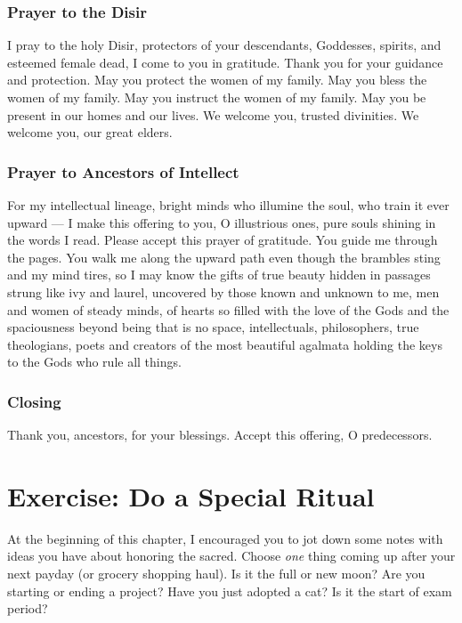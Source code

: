 \documentclass[
]{book}
\begin{document}
\hypertarget{prayer-to-the-disir}{%
\subsubsection{Prayer to the Disir}\label{prayer-to-the-disir}}

I pray to the holy Disir,
protectors of your descendants,
Goddesses, spirits, and esteemed female dead,
I come to you in gratitude.
Thank you for your guidance and protection.
May you protect the women of my family.
May you bless the women of my family.
May you instruct the women of my family.
May you be present in our homes and our lives.
We welcome you, trusted divinities.
We welcome you, our great elders.

\hypertarget{prayer-to-ancestors-of-intellect}{%
\subsubsection{Prayer to Ancestors of Intellect}\label{prayer-to-ancestors-of-intellect}}

For my intellectual lineage,
bright minds who illumine the soul,
who train it ever upward ---
I make this offering to you, O illustrious ones,
pure souls shining in the words I read.
Please accept this prayer of gratitude.
You guide me through the pages.
You walk me along the upward path
even though the brambles sting and my mind tires,
so I may know the gifts of true beauty
hidden in passages strung like ivy and laurel,
uncovered by those known and unknown to me,
men and women of steady minds,
of hearts so filled with the love of the Gods
and the spaciousness beyond being that is no space,
intellectuals, philosophers, true theologians,
poets and creators of the most beautiful agalmata
holding the keys to the Gods who rule all things.

\hypertarget{closing}{%
\subsubsection{Closing}\label{closing}}

Thank you, ancestors, for your blessings. Accept this offering, O predecessors.

\hypertarget{exercise-do-a-special-ritual}{%
\section{Exercise: Do a Special Ritual}\label{exercise-do-a-special-ritual}}

At the beginning of this chapter, I encouraged you to jot down some notes with ideas you have about honoring the sacred. Choose \emph{one} thing coming up after your next payday (or grocery shopping haul). Is it the full or new moon? Are you starting or ending a project? Have you just adopted a cat? Is it the start of exam period?
\end{document}
